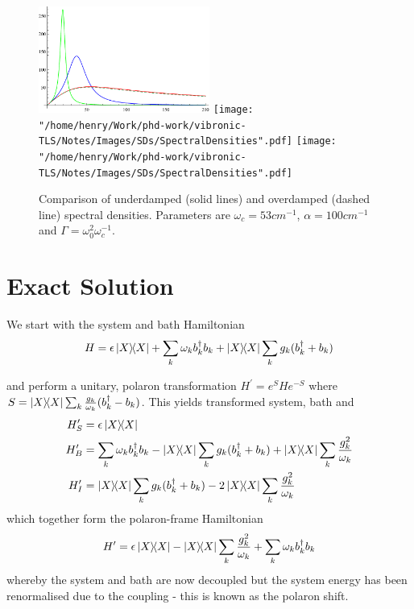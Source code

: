 \documentclass[]{article}
\begin{document}
\begin{figure}
	\includegraphics[width=0.5\textwidth]{Images/SDs/SpectralDensities.pdf}
	\texttt{[image: "/home/henry/Work/phd-work/vibronic-TLS/Notes/Images/SDs/SpectralDensities".pdf]}
	\texttt{[image: "/home/henry/Work/phd-work/vibronic-TLS/Notes/Images/SDs/SpectralDensities".pdf]}
	\caption{Comparison of underdamped (solid lines) and overdamped (dashed line) spectral densities. Parameters are $\omega_c=53cm^{-1}$, $\alpha=100cm^{-1}$ and $\Gamma=\omega_0^2\omega_c^{-1}$.}
\end{figure}
\section{Exact Solution}
We start with the system and bath Hamiltonian
\begin{equation}
H = \epsilon\dyad{X} + \sum_{k}\omega_k b_k^{\dagger} b_k + \dyad{X}\sum_{k}g_k (b_k^{\dagger}+b_k)
\end{equation}

and perform a unitary, polaron transformation $H^{\prime} = e^{S}He^{-S}$ where $S= \dyad{X}\sum_{k}\frac{g_k}{\omega_k}(b_k^{\dagger}-b_k)$. This yields transformed system, bath and 
\begin{align}
H_S^{\prime} &= \epsilon\dyad{X} \\
H_B^{\prime} &= \sum_{k}\omega_k b_k^{\dagger}b_k - \dyad{X}\sum_{k}g_k (b_k^{\dagger}+b_k) +\dyad{X}\sum_{k}\frac{g^2_k}{\omega_k} \\
H_I^{\prime} &= \dyad{X}\sum_{k}g_k (b_k^{\dagger}+b_k) - 2\dyad{X}\sum_{k}\frac{g^2_k}{\omega_k} \\
\end{align}
which together form the polaron-frame Hamiltonian
\begin{equation}
H^{\prime} = \epsilon\dyad{X} - \dyad{X}\sum_{k}\frac{g^2_k}{\omega_k} + \sum_{k}\omega_k b_k^{\dagger}b_k
\end{equation}
whereby the system and bath are now decoupled but the system energy has been renormalised due to the coupling - this is known as the polaron shift.
\end{document}
